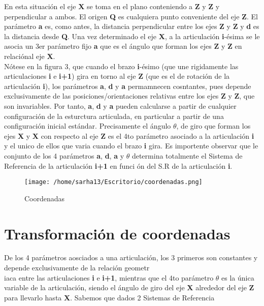 \documentclass[letter,openright,12pt,spanish]{report}
\begin{document}
En esta situaci\'on el eje \textbf{X} se toma en el plano conteniendo a \textbf{Z} y \textbf{Z} y perpendicular a ambos. 
El origen \textbf{Q} es cualquiera punto conveniente del eje \textbf{Z}. 
El par\'ametro \textbf{a} es, como antes, la distancia perpendicular entre los ejes \textbf{Z} y \textbf{Z} y \textbf{d} es la distancia desde \textbf{Q}.
Una vez determinado el eje \textbf{X}, a la articulaci\'on \textbf{i}-\'esima se le asocia un 3er par\'ametro fijo \textbf{a} que es el \'angulo que forman los ejes \textbf{Z} y \textbf{Z} en relaci\'onal eje \textbf{X}.\\
N\'otese en la figura 3, que cuando el brazo \textbf{i}-\'esimo (que une rigidamente las articulaciones \textbf{i} e \textbf{i+1}) gira en torno al eje \textbf{Z} (que es el de rotaci\'on de la articulaci\'on \textbf{i}), los par\'ametros \textbf{a}, \textbf{d} y \textbf{a} permamnecen cosntantes, pues depende exclusivamente de las posiciones/orientaciones relativas entre los ejes \textbf{Z} y \textbf{Z}, que son invariables. Por tanto, \textbf{a}, \textbf{d} y \textbf{a} pueden calcularse a partir de cualquier configuraci\'on de la esturctura articulada, en particular a partir de una configuraci\'on inicial est\'andar. Precisamente el \'angulo $\theta$, de giro que forman los ejes \textbf{X} y \textbf{X} con respecto al eje \textbf{Z} es el 4to par\'ametro asociado a la articulaci\'on \textbf{i} y el unico de ellos que varia cuando el brazo \textbf{i} gira.
Es importente observar que le conjunto de los 4 par\'ametros \textbf{a}, \textbf{d}, \textbf{a} y \textbf{$\theta$} determina totalmente el Sistema de Referencia de la articulaci\'on \textbf{i+1} en funci \'on del S.R de la articulaci\'on \textbf{i}.

\begin{figure}[htp]
\centering
\texttt{[image: /home/sarha13/Escritorio/coordenadas.png]}
\caption{Coordenadas}
\label{Figura 3.}
\end{figure}

\section{Transformaci\'on de coordenadas}

De los 4 par\'ametros aosciados a una articulaci\'on, los 3 primeros son constantes y depende exclusivamente de la relaci\'on geometr\\iaca entre las articulaciones \textbf{i} e \textbf{i+1}, mientras que el 4to par\'ametro $\theta$ es la \'unica variable de la articulaci\'on, siendo el \'angulo de giro del eje \textbf{X} alrededor del eje \textbf{Z} para llevarlo hasta \textbf{X}. 
Sabemos que dados 2 Sistemas de Referencia 
\end{document}
